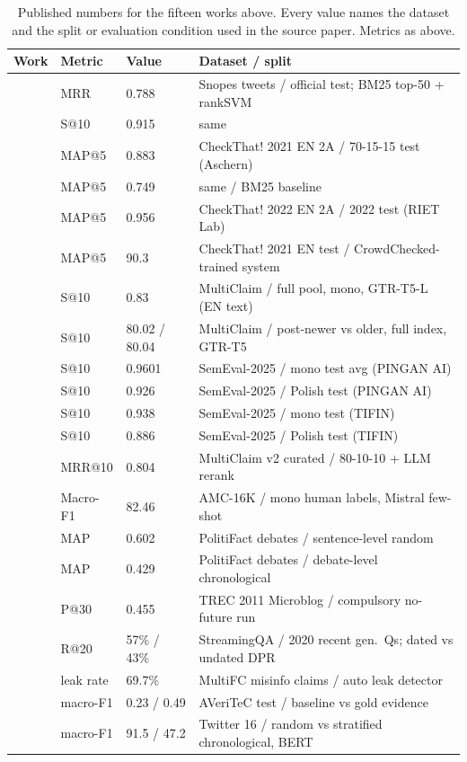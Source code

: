 \documentclass[11pt]{article}
\begin{document}
\begin{table}[t]
\centering
\caption{Published numbers for the fifteen works above. Every value names the dataset and the split or evaluation condition used in the source paper. Metrics as above.}
\label{tab:sota}
\small
\setlength{\tabcolsep}{4pt}
\begin{tabular}{@{}llp{2.2cm}p{7.2cm}@{}}
\toprule
Work & Metric & Value & Dataset / split \\
\midrule
\cite{shaar2020that} & MRR & 0.788 & Snopes tweets / official test; BM25 top-50 + rankSVM \\
\cite{shaar2020that} & S@10 & 0.915 & same \\
\cite{shaar2021overview} & MAP@5 & 0.883 & CheckThat! 2021 EN 2A / 70-15-15 test (Aschern) \\
\cite{shaar2021overview} & MAP@5 & 0.749 & same / BM25 baseline \\
\cite{nakov2022overview} & MAP@5 & 0.956 & CheckThat! 2022 EN 2A / 2022 test (RIET Lab) \\
\cite{hardalov2022crowdchecked} & MAP@5 & 90.3 & CheckThat! 2021 EN test / CrowdChecked-trained system \\
\cite{pikuliak2023multilingual} & S@10 & 0.83 & MultiClaim / full pool, mono, GTR-T5-L (EN text) \\
\cite{pikuliak2023multilingual} & S@10 & 80.02 / 80.04 & MultiClaim / post-newer vs older, full index, GTR-T5 \\
\cite{peng2025semeval} & S@10 & 0.9601 & SemEval-2025 / mono test avg (PINGAN AI) \\
\cite{peng2025semeval} & S@10 & 0.926 & SemEval-2025 / Polish test (PINGAN AI) \\
\cite{devadiga2025tifin} & S@10 & 0.938 & SemEval-2025 / mono test (TIFIN) \\
\cite{devadiga2025tifin} & S@10 & 0.886 & SemEval-2025 / Polish test (TIFIN) \\
\cite{ramponi2025multilingual} & MRR@10 & 0.804 & MultiClaim v2 curated / 80-10-10 + LLM rerank \\
\cite{vykopal2025large} & Macro-F1 & 82.46 & AMC-16K / mono human labels, Mistral few-shot \\
\cite{shaar2022role} & MAP & 0.602 & PolitiFact debates / sentence-level random \\
\cite{shaar2022role} & MAP & 0.429 & PolitiFact debates / debate-level chronological \\
\cite{ounis2011overview} & P@30 & 0.455 & TREC 2011 Microblog / compulsory no-future run \\
\cite{liska2022streamingqa} & R@20 & 57\% / 43\% & StreamingQA / 2020 recent gen.\ Qs; dated vs undated DPR \\
\cite{glockner2022missing} & leak rate & 69.7\% & MultiFC misinfo claims / auto leak detector \\
\cite{schlichtkrull2023averitec} & macro-F1 & 0.23 / 0.49 & AVeriTeC test / baseline vs gold evidence \\
\cite{mu2023its} & macro-F1 & 91.5 / 47.2 & Twitter 16 / random vs stratified chronological, BERT \\
\bottomrule
\end{tabular}
\end{table}
\end{document}
